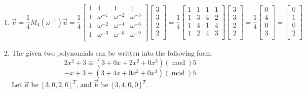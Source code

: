 \documentclass[11pt]{article}
\newenvironment{qparts}{\begin{enumerate}[{(}a{)}]}{\end{enumerate}}
\begin{document}
\begin{qparts}
	\item
	\[
		\vec v = \frac{1}{4}M_4(\omega^{-1})\vec u
		= 
		\frac{1}{4}
		\begin{bmatrix} 
			1 & 1 & 1 & 1 \\ 
			1 & \omega^{-1} & \omega^{-2} & \omega^{-3} \\ 
			1 & \omega^{-2} & \omega^{-4} & \omega^{-6} \\ 
			1 & \omega^{-3} & \omega^{-6} & \omega^{-9} \\ 
		\end{bmatrix}
		\begin{bmatrix} 
			3 \\ 
			3 \\ 
			2 \\ 
			2 \\ 
		\end{bmatrix}
		=
		\frac{1}{4}
		\begin{bmatrix} 
			1 & 1 & 1 & 1 \\ 
			1 & 3 & 4 & 2 \\ 
			1 & 4 & 1 & 4 \\ 
			1 & 2 & 4 & 3 \\ 
		\end{bmatrix}		
		\begin{bmatrix} 
			3 \\ 
			3 \\ 
			2 \\ 
			2 \\ 
		\end{bmatrix}
		=
		\frac{1}{4}
		\begin{bmatrix} 
			0 \\ 
			4 \\ 
			0 \\ 
			3 \\ 
		\end{bmatrix}
		=
		\begin{bmatrix} 
			0 \\ 
			1 \\ 
			0 \\ 
			2 \\ 
		\end{bmatrix} 
	\]
	
	\item
	The given two polynomials can be written into the following form.
	\[
		2x^2 + 3 \equiv (3 + 0x + 2x^2 + 0x^3)(\operatorname{mod})5
	\]
	\[
		-x + 3 \equiv (3 + 4x + 0x^2 + 0x^3)(\operatorname{mod})5
	\]
	Let $\vec a$ be $[3, 0, 2, 0]^T$,  and $\vec b$ be $[3, 4, 0, 0]^T$. 
	

\end{qparts}
\end{document}
